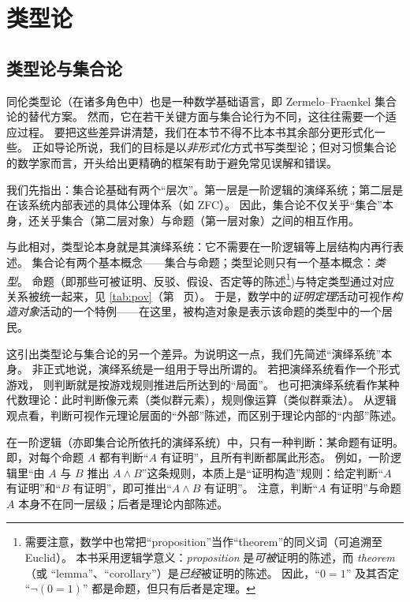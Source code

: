 \chapter{类型论}
\label{cha:typetheory}

\section{类型论与集合论}
\label{sec:types-vs-sets}
\label{sec:axioms}

同伦类型论（在诸多角色中）也是一种数学基础语言，即 Zermelo--Fraenkel 集合论的替代方案。
然而，它在若干关键方面与集合论行为不同，这往往需要一个适应过程。
要把这些差异讲清楚，我们在本节不得不比本书其余部分更形式化一些。
正如导论所说，我们的目标是以\emph{非形式化}方式书写类型论；但对习惯集合论的数学家而言，开头给出更精确的框架有助于避免常见误解和错误。

我们先指出：集合论基础有两个“层次”。第一层是一阶逻辑的演绎系统；第二层是在该系统内部表述的具体公理体系（如 ZFC）。
因此，集合论不仅关乎“集合”本身，还关乎集合（第二层对象）与命题（第一层对象）之间的相互作用。

与此相对，类型论本身就是其演绎系统：它不需要在一阶逻辑等上层结构内再行表述。
集合论有两个基本概念——集合与命题；类型论则只有一个基本概念：\emph{类型}。
命题（即那些可被证明、反驳、假设、否定等的陈述\footnote{需要注意，数学中也常把“proposition”当作“theorem”的同义词（可追溯至 Euclid）。
本书采用逻辑学意义：\emph{proposition} 是\emph{可被}证明的陈述，而 \emph{theorem}（或 “lemma”、“corollary”）是\emph{已经}被证明的陈述。
因此，``$0=1$'' 及其否定 ``$\neg(0=1)$'' 都是命题，但只有后者是定理。})与特定类型通过对应关系被统一起来，见 \cref{tab:pov}（第~\pageref{tab:pov} 页）。
于是，数学中的\emph{证明定理}活动可视作\emph{构造对象}活动的一个特例——在这里，被构造对象是表示该命题的类型中的一个居民。

%
这引出类型论与集合论的另一个差异。为说明这一点，我们先简述“演绎系统”本身。
非正式地说，演绎系统是一组用于导出所谓的。
%
%
若把演绎系统看作一个形式游戏，
%
则判断就是按游戏规则推进后所达到的“局面”。
也可把演绎系统看作某种代数理论：此时判断像元素（类似群元素），规则像运算（类似群乘法）。
从逻辑观点看，判断可视作元理论层面的“外部”陈述，而区别于理论内部的“内部”陈述。

在一阶逻辑（亦即集合论所依托的演绎系统）中，只有一种判断：某命题有证明。
即，对每个命题 $A$ 都有判断“$A$ 有证明”，且所有判断都属此形态。
例如，一阶逻辑里“由 $A$ 与 $B$ 推出 $A\wedge B$”这条规则，本质上是“证明构造”规则：给定判断“$A$ 有证明”和“$B$ 有证明”，即可推出“$A\wedge B$ 有证明”。
注意，判断“$A$ 有证明”与命题 $A$ 本身不在同一层级；后者是理论内部陈述。

